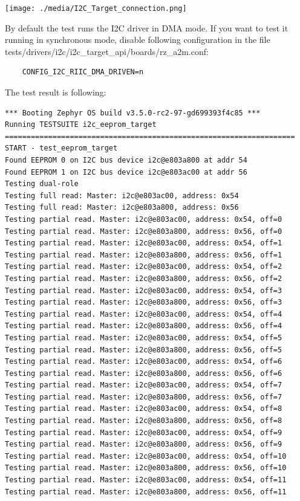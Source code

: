 \documentclass[11pt,a4paper,oneside]{article}
\begin{document}
\texttt{[image: ./media/I2C\_Target\_connection.png]}

By default the test runs the I2C driver in DMA mode. If you want to test it running in synchronous mode, disable following configuration in the file tests/drivers/i2c/i2c\_target\_api/boards/rz\_a2m.conf:

\begin{lstlisting}
	CONFIG_I2C_RIIC_DMA_DRIVEN=n
\end{lstlisting}

The test result is following:

\begin{lstlisting}
*** Booting Zephyr OS build v3.5.0-rc2-97-gd699393f4c85 ***
Running TESTSUITE i2c_eeprom_target
===================================================================
START - test_eeprom_target
Found EEPROM 0 on I2C bus device i2c@e803a800 at addr 54
Found EEPROM 1 on I2C bus device i2c@e803ac00 at addr 56
Testing dual-role
Testing full read: Master: i2c@e803ac00, address: 0x54
Testing full read: Master: i2c@e803a800, address: 0x56
Testing partial read. Master: i2c@e803ac00, address: 0x54, off=0
Testing partial read. Master: i2c@e803a800, address: 0x56, off=0
Testing partial read. Master: i2c@e803ac00, address: 0x54, off=1
Testing partial read. Master: i2c@e803a800, address: 0x56, off=1
Testing partial read. Master: i2c@e803ac00, address: 0x54, off=2
Testing partial read. Master: i2c@e803a800, address: 0x56, off=2
Testing partial read. Master: i2c@e803ac00, address: 0x54, off=3
Testing partial read. Master: i2c@e803a800, address: 0x56, off=3
Testing partial read. Master: i2c@e803ac00, address: 0x54, off=4
Testing partial read. Master: i2c@e803a800, address: 0x56, off=4
Testing partial read. Master: i2c@e803ac00, address: 0x54, off=5
Testing partial read. Master: i2c@e803a800, address: 0x56, off=5
Testing partial read. Master: i2c@e803ac00, address: 0x54, off=6
Testing partial read. Master: i2c@e803a800, address: 0x56, off=6
Testing partial read. Master: i2c@e803ac00, address: 0x54, off=7
Testing partial read. Master: i2c@e803a800, address: 0x56, off=7
Testing partial read. Master: i2c@e803ac00, address: 0x54, off=8
Testing partial read. Master: i2c@e803a800, address: 0x56, off=8
Testing partial read. Master: i2c@e803ac00, address: 0x54, off=9
Testing partial read. Master: i2c@e803a800, address: 0x56, off=9
Testing partial read. Master: i2c@e803ac00, address: 0x54, off=10
Testing partial read. Master: i2c@e803a800, address: 0x56, off=10
Testing partial read. Master: i2c@e803ac00, address: 0x54, off=11
Testing partial read. Master: i2c@e803a800, address: 0x56, off=11

\end{lstlisting}
\end{document}
